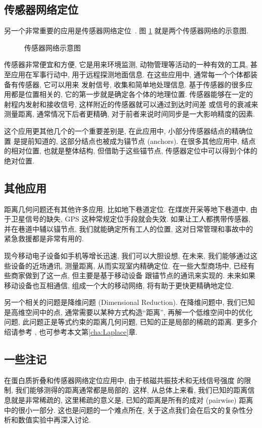 \documentclass{CASthesis_zzk}
\begin{document}
\subsection{传感器网络定位} 
另一个非常重要的应用是传感器网络定位~\cite{Akyildiz2002,Chong2003,Mao2007,Yick2008}. 图 \ref{fig:sensor} 就是两个传感器网络的示意图.
\begin{figure}[htbp]
  \centering
  \caption{传感器网络示意图}
  \label{fig:sensor}
\end{figure}

传感器非常便宜和方便, 它是用来环境监测, 动物管理等活动的一种有效的工具, 
甚至应用在军事行动中, 用于远程探测地面信息.
在这些应用中, 通常每一个个体都装备有传感器, 它可以用来
发射信号, 收集和简单地处理信息.
基于传感器的很多应用都是位置相关的, 它的第一步就是确定各个体的地理位置.
传感器能够在一定的射程内发射和接收信号, 这样附近的传感器就可以通过到达时间差
或信号的衰减来测量距离, 通常情况下后者更精确, 
对于前者来说时间同步是一大影响精度的因素.

这个应用更其他几个的一个重要差别是, 在此应用中, 小部分传感器结点的精确位置
是提前知道的, 这部分结点也被成为锚节点 (anchors).
在很多其他应用中, 结点的相对位置, 也就是整体结构,
但借助于这些锚节点, 传感器定位中可以得到个体的绝对位置.
 
\subsection{其他应用}
距离几何问题还有其他许多应用, 比如地下巷道定位.
在煤炭开采等地下巷道中, 由于卫星信号的缺失, GPS 这种常规定位手段就会失效.
如果让工人都携带传感器, 并在巷道中辅以锚节点, 
我们就能确定所有工人的位置, 这对日常管理和事故中的紧急救援都是非常有用的.

现今移动电子设备如手机等增长迅速, 我们可以大胆设想, 
在未来, 我们能够通过这些设备的近场通讯, 测量距离, 从而实现室内精确定位.
在一些大型商场中, 已经有些商家做到了这一点, 但主要是基于移动设备
跟锚节点的通讯来实现的. 未来如果移动设备也互相通信,
组成一个大的移动网络, 将有助于更快更精确地定位.

另一个相关的问题是降维问题 (Dimensional Reduction).
在降维问题中, 我们已知是高维空间中的点, 通常需要以某种方式构造``距离'',
再解一个低维空间中的优化问题,
此问题正是等式约束的距离几何问题, 已知的正是局部的稀疏的距离. 
更多介绍请参考 \cite{}, 也可参考本文第\ref{cha:Laplace}章.

\subsection{一些注记}
在蛋白质折叠和传感器网络定位应用中, 由于核磁共振技术和无线信号强度
的限制, 我们能够测得的距离通常都是局部的.
这样, 从总体上来看, 我们已知的距离信息就是非常稀疏的,
这里稀疏的意义是, 已知的距离是所有的成对 (pairwise) 距离中的很小一部分.
这也是问题的一个难点所在, 关于这点我们会在后文的复杂性分析和数值实验中再深入讨论.
\end{document}
